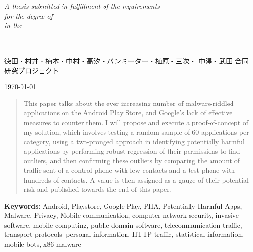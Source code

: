 \documentclass[
11pt, %
english, %
singlespacing, %
headsepline, %
openright, %
]{MastersDoctoralThesis} %
\numberwithin{figure}{section} %
\numberwithin{equation}{section} %
\begin{document}
\begin{titlepage}
\begin{center}
\vfill

\large \textit{A thesis submitted in fulfillment of the requirements\\ for the degree of \degreename}\\[0.3cm] %
\textit{in the}\\[0.4cm]
\deptname\\\groupname\\[2cm] %
\begin{CJK}{UTF8}{min}徳田・村井・楠本・中村・高汐・バンミーター・植原・三次・
中澤・武田 合同研究プロジェクト\end{CJK} 
\vfill

{\large \today}\\[4cm] %
 
\vfill
\end{center}
\end{titlepage}



\begin{abstract}
\addchaptertocentry{\abstractname} %
This paper talks about the ever increasing number of malware-riddled applications on the Android Play Store, and Google's lack of effective measures to counter them. I will propose and execute a proof-of-concept of my solution, which involves testing a random sample of 60 applications per category, using a two-pronged approach in identifying potentially harmful applications by performing robust regression of their permissions to find outliers, and then confirming these outliers by comparing the amount of traffic sent of a control phone with few contacts and a test phone with hundreds of contacts. A value is then assigned as a gauge of their potential risk and published towards the end of this paper.
\end{abstract}

\noindent
\textbf{Keywords:}
Android, Playstore, Google Play, PHA, Potentially Harmful Apps, 
Malware, Privacy, Mobile communication, computer network security, invasive software, mobile computing, public domain software, telecommunication traffic, transport protocols, personal information, HTTP traffic, statistical 
information, mobile bots, x86 malware
\end{document}
